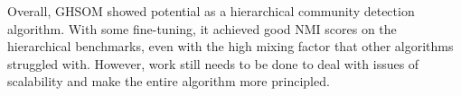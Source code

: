\documentclass{article}
\begin{document}
Overall, GHSOM showed potential as a hierarchical community detection algorithm. 
With some fine-tuning, it achieved good NMI scores on the hierarchical benchmarks, even with the high mixing factor that other algorithms struggled with. 
However, work still needs to be done to deal with issues of scalability and make the entire algorithm more principled. 



%


%


\end{document}
